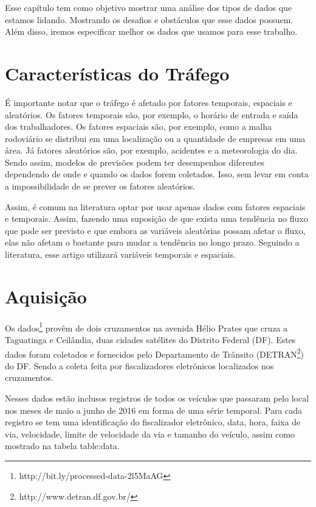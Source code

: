 
Esse capítulo tem como objetivo mostrar uma análise dos tipos de dados que estamos lidando. Mostrando os desafios e obstáculos que esse dados possuem. Além disso, iremos especificar melhor os dados que usamos para esse trabalho.

\section{Características do Tráfego}

É importante notar que o tráfego é afetado por fatores temporais, espaciais e aleatórios. Os fatores temporais são, por exemplo, o horário de entrada e saída dos trabalhadores. Os fatores espaciais são, por exemplo, como a malha rodoviário se distribui em uma localização ou a quantidade de empresas em uma área. Já fatores aleatórios são, por exemplo, acidentes e a meteorologia do dia. Sendo assim, modelos de previsões podem ter desempenhos diferentes dependendo de onde e quando os dados forem coletados. Isso, sem levar em conta a impossibilidade de se prever os fatores aleatórios.

Assim, é comum na literatura optar por usar apenas dados com fatores espaciais e temporais. Assim, fazendo uma suposição de que exista uma tendência no fluxo que pode ser previsto e que embora as variáveis aleatórias possam afetar o fluxo, elas não afetam o bastante para mudar a tendência no longo prazo. Seguindo a literatura, esse artigo utilizará variáveis temporais e espaciais.

\section{Aquisição}

Os dados\footnote{http://bit.ly/processed-data-2l5MaAG} provêm de dois cruzamentos na avenida Hélio Prates que cruza a Taguatinga e Ceilândia, duas cidades satélites do Distrito Federal (DF). Estes dados foram coletados e fornecidos pelo Departamento de Trânsito (DETRAN\footnote{http://www.detran.df.gov.br/}) do DF. Sendo a coleta feita por fiscalizadores eletrônicos localizados nos cruzamentos.

Nesses dados estão inclusos registros de todos os veículos que passaram pelo local nos meses de maio a junho de 2016 em forma de uma série temporal. Para cada registro se tem uma identificação do fiscalizador eletrônico, data, hora, faixa de via, velocidade, limite de velocidade da via e tamanho do veículo, assim como mostrado na tabela {table:data}.

